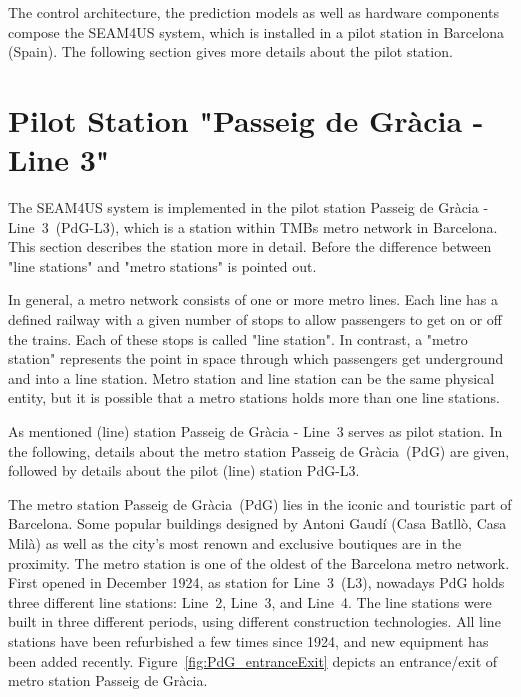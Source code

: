 The control architecture, the prediction models as well as hardware components compose the SEAM4US system, which is installed in a pilot station in Barcelona (Spain). The following section gives more details about the pilot station.


\section{Pilot Station "Passeig de Gr\`{a}cia - Line 3"}
\label{sec:station}


The SEAM4US system is implemented in the pilot station Passeig de Gr\`{a}cia - Line~3~(PdG-L3), which is a station within TMBs metro network in Barcelona. This section describes the station more in detail.
Before the difference between "line stations" and "metro stations" is pointed out.

In general, a metro network consists of one or more metro lines. Each line has a defined railway with a given number of stops to allow passengers to get on or off the trains. Each of these stops is called "line station". In contrast, a "metro station" represents the point in space through which passengers get underground and into a line station. Metro station and line station can be the same physical entity, but it is possible that a metro stations holds more than one line stations.

As mentioned (line) station Passeig de Gr\`{a}cia - Line~3 serves as pilot station. In the following, details about the metro station Passeig de Gr\`{a}cia~(PdG) are given, followed by details about the pilot (line) station PdG-L3.

The metro station Passeig de Gr\`{a}cia~(PdG) lies in the iconic and touristic part of Barcelona. Some popular buildings designed by Antoni Gaud\'{i} (Casa Batll\`{o}, Casa Mil\`{a}) as well as the city's most renown and exclusive boutiques are in the proximity.
The metro station is one of the oldest of the Barcelona metro network. First opened in December 1924, as station for Line~3~(L3), nowadays PdG holds three different line stations: Line~2, Line~3, and Line~4. The line stations were built in three different periods, using different construction technologies. All line stations have been refurbished a few times since 1924, and new equipment has been added recently. Figure~\ref{fig:PdG_entranceExit} depicts an entrance/exit of metro station Passeig de Gr\`{a}cia.

